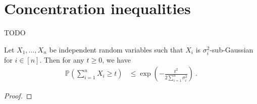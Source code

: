 \chapter{Concentration inequalities}

\begin{definition}\label{def:subGaussian}
  \mathlibok
TODO
\end{definition}


\begin{theorem}\label{thm:hoeffding}
  \mathlibok
Let $X_1, \ldots, X_n$ be independent random variables such that $X_i$ is $\sigma_i^2$-sub-Gaussian for $i \in [n]$.
Then for any $t \ge 0$, we have
\begin{align*}
  \mathbb{P}\left(\sum_{i=1}^n X_i \ge t\right)
  &\le \exp\left(- \frac{t^2}{2 \sum_{i=1}^n \sigma_i^2}\right)
  \: .
\end{align*}
\end{theorem}

\begin{proof}\leanok

\end{proof}
